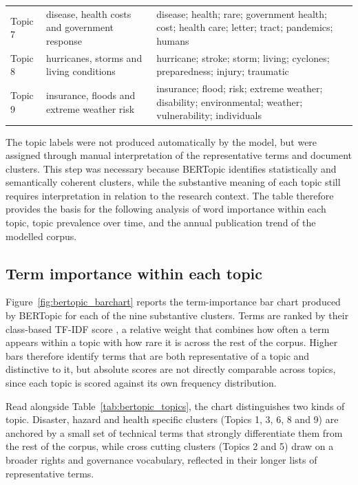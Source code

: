 \documentclass[12pt,a4paper]{report}
\begin{document}
\begin{table}[H]
\begin{tabularx}{\textwidth}{
>{\raggedright\arraybackslash}p{}
>{\raggedright\arraybackslash}X
>{\raggedright\arraybackslash}X
}
Topic 7
& disease, health costs and government response
& disease; health; rare; government health; cost; health care; letter; tract; pandemics; humans \\

Topic 8
& hurricanes, storms and living conditions
& hurricane; stroke; storm; living; cyclones; preparedness; injury; traumatic \\

Topic 9
& insurance, floods and extreme weather risk
& insurance; flood; risk; extreme weather; disability; environmental; weather; vulnerability; individuals \\

\bottomrule
\end{tabularx}
\end{table}
The topic labels were not produced automatically by the model, but were assigned through manual interpretation of the representative terms and document clusters. This step was necessary because BERTopic identifies statistically and semantically coherent clusters, while the substantive meaning of each topic still requires interpretation in relation to the research context. The table therefore provides the basis for the following analysis of word importance within each topic, topic prevalence over time, and the annual publication trend of the modelled corpus.

\subsection{Term importance within each topic}
Figure~\ref{fig:bertopic_barchart} reports the term-importance bar chart produced by BERTopic for each of the nine substantive clusters. Terms are ranked by their class-based TF-IDF score \cite{grootendorst_2022_bertopic}, a relative weight that combines how often a term appears within a topic with how rare it is across the rest of the corpus. Higher bars therefore identify terms that are both representative of a topic and distinctive to it, but absolute scores are not directly comparable across topics, since each topic is scored against its own frequency distribution.

Read alongside Table~\ref{tab:bertopic_topics}, the chart distinguishes two kinds of topic. Disaster, hazard and health specific clusters (Topics 1, 3, 6, 8 and 9) are anchored by a small set of technical terms that strongly differentiate them from the rest of the corpus, while cross cutting clusters (Topics 2 and 5) draw on a broader rights and governance vocabulary, reflected in their longer lists of representative terms.
\end{document}
